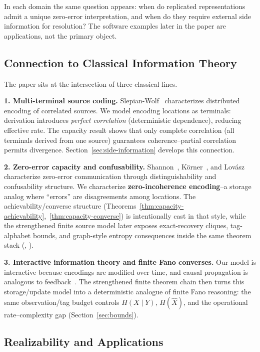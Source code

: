 In each domain the same question appears: when do replicated representations admit a unique zero-error interpretation, and when do they require external side information for resolution? The software examples later in the paper are applications, not the primary object.

\subsection{Connection to Classical Information Theory}\label{sec:connection-it}

The paper sits at the intersection of three classical lines.

\textbf{1. Multi-terminal source coding.} Slepian-Wolf~\cite{slepian1973noiseless} characterizes distributed encoding of correlated sources. We model encoding locations as terminals: derivation introduces \emph{perfect correlation} (deterministic dependence), reducing effective rate. The capacity result shows that only complete correlation (all terminals derived from one source) guarantees coherence--partial correlation permits divergence. Section~\ref{sec:side-information} develops this connection.

\textbf{2. Zero-error capacity and confusability.} Shannon~\cite{shannon1956zero}, Körner~\cite{korner1973graphs}, and Lovász~\cite{lovasz1979shannon} characterize zero-error communication through distinguishability and confusability structure. We characterize \textbf{zero-incoherence encoding}--a storage analog where ``errors'' are disagreements among locations. The achievability/converse structure (Theorems~\ref{thm:capacity-achievability},~\ref{thm:capacity-converse}) is intentionally cast in that style, while the strengthened finite source model later exposes exact-recovery cliques, tag-alphabet bounds, and graph-style entropy consequences inside the same theorem stack (, ).

\textbf{3. Interactive information theory and finite Fano converses.} Our model is interactive because encodings are modified over time, and causal propagation is analogous to feedback~\cite{birs2012interactive,ma2011distributed}. The strengthened finite theorem chain then turns this storage/update model into a deterministic analogue of finite Fano reasoning: the same observation/tag budget controls $H(X\mid Y)$, $H(\hat X)$, and the operational rate--complexity gap (Section~\ref{sec:bounds}).

\subsection{Realizability and Applications}\label{sec:realizability}

